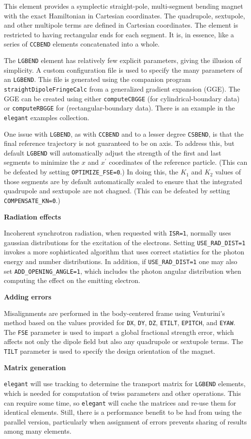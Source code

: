 This element provides a symplectic straight-pole, multi-segment bending magnet with the exact
Hamiltonian in Cartesian coordinates.
The quadrupole, sextupole, and other multipole terms are defined in Cartesian coordinates.
The element is restricted to having rectangular ends for each segment.
It is, in essence, like a series of \verb|CCBEND| \cite{Borland-LS356} elements concatenated into a whole.

The \verb|LGBEND| element has relatively few explicit parameters, giving the illusion of simplicity.
A custom configuration file is used to specify the many parameters of an \verb|LGBEND|.
This file is generated using the companion program \verb|straightDipoleFringeCalc| from 
a generalized gradient expansion (GGE). The  GGE can be
created using either \verb|computeCBGGE| (for cylindrical-boundary data) or \verb|computeRBGGE|
for (rectangular-boundary data). There is an example in the {\tt elegant} examples collection.

One issue with \verb|LGBEND|, as with \verb|CCBEND| and to a lesser degree \verb|CSBEND|, is that 
the final reference trajectory is not guaranteed to be on axis.
To address this, but default \verb|LGBEND| will automatically adjust the strength of the
first and last segments to minimize the $x$ and $x^\prime$ coordinates of the reference particle.
(This can be defeated by setting \verb|OPTIMIZE_FSE=0|.)
In doing this, the $K_1$ and $K_2$ values of those segments are by default automatically scaled
to ensure that the integrated quadrupole and sextupole are not chagned. 
(This can be defeated by setting \verb|COMPENSATE_KN=0|.)

{\bf Radiation effects}

Incoherent synchrotron radiation, when requested with {\tt ISR=1},
normally uses gaussian distributions for the excitation of the electrons.
Setting {\tt USE\_RAD\_DIST=1} invokes a more sophisticated algorithm that
uses correct statistics for the photon energy and number distributions.
In addition, if {\tt USE\_RAD\_DIST=1} one may also set {\tt ADD\_OPENING\_ANGLE=1},
which includes the photon angular distribution when computing the effect on 
the emitting electron.  

{\bf Adding errors}

Misalignments are performed in the body-centered frame using Venturini's method \cite{Venturini2021}
based on the values provided for \verb|DX|, \verb|DY|, \verb|DZ|, \verb|ETILT|, \verb|EPITCH|, 
and \verb|EYAW|.
The \verb|FSE| parameter is used to impart a global fractional strength error, which affects not only
the dipole field but also any quadrupole or sextupole terms.
The \verb|TILT| parameter is used to specify the design orientation of the magnet.

{\bf Matrix generation}

{\tt elegant} will use tracking to determine the transport matrix for \verb|LGBEND| elements, which 
is needed for computation of twiss parameters and other operations.
This can require some time, so {\tt elegant} will cache the matrices and re-use them for
identical elements.
Still, there is a performance benefit to be had from using the parallel version, particularly
when assignment of errors prevents sharing of results among many elements.
